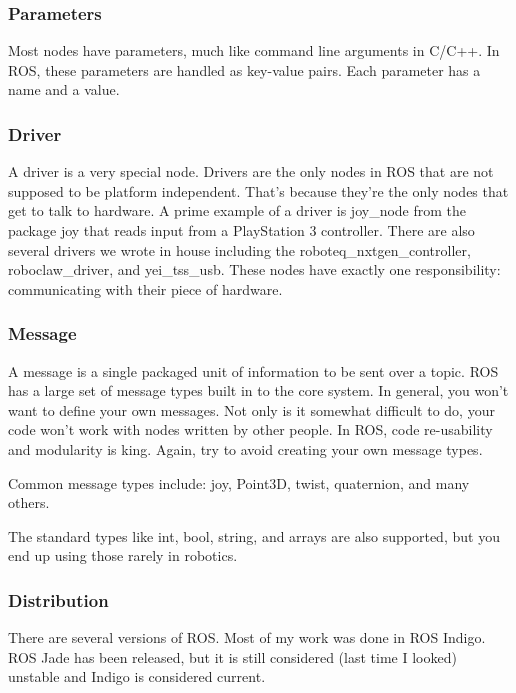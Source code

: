 \subsubsection{Parameters}

Most nodes have parameters, much like command line arguments in C/C++. In ROS, these parameters are handled as key-value pairs. Each parameter has a name and a value.

\subsubsection{Driver}

A driver is a very special node. Drivers are the only nodes in ROS that are not supposed to be platform independent. That's because they're the only nodes that get to talk to hardware. A prime example of a driver is joy\_node from the package joy that reads input from a PlayStation 3 controller. There are also several drivers we wrote in house including the roboteq\_nxtgen\_controller, roboclaw\_driver, and yei\_tss\_usb. These nodes have exactly one responsibility: communicating with their piece of hardware. 

\subsubsection{Message}

A message is a single packaged unit of information to be sent over a topic. ROS has a large set of message types built in to the core system. In general, you won't want to define your own messages. Not only is it somewhat difficult to do, your code won't work with nodes written by other people. In ROS, code re-usability and modularity is king. Again, try to avoid creating your own message types.

Common message types include: joy, Point3D, twist, quaternion, and many others.

The standard types like int, bool, string, and arrays are also supported, but you end up using those rarely in robotics.

\subsubsection{Distribution}

There are several versions of ROS. Most of my work was done in ROS Indigo. ROS Jade has been released, but it is still considered (last time I looked) unstable and Indigo is considered current.

